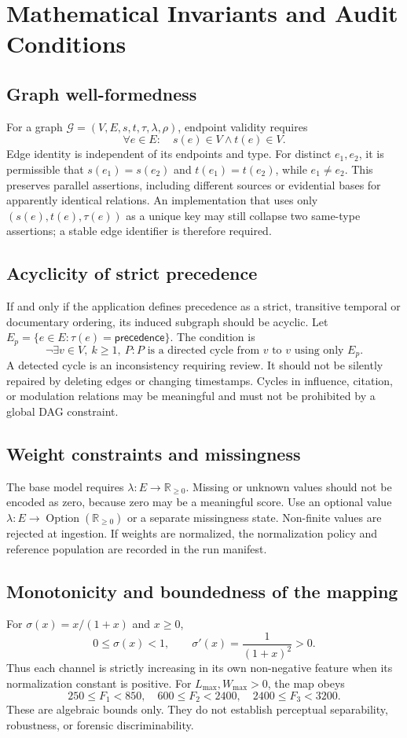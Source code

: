 \documentclass[11pt]{article}
\begin{document}
\section{Mathematical Invariants and Audit Conditions}
\subsection{Graph well-formedness}
For a graph $\mathcal{G}=(V,E,s,t,\tau,\lambda,\rho)$, endpoint validity requires
\[
\forall e\in E:\quad s(e)\in V\land t(e)\in V.
\]
Edge identity is independent of its endpoints and type. For distinct $e_1,e_2$, it is permissible that $s(e_1)=s(e_2)$ and $t(e_1)=t(e_2)$, while $e_1\neq e_2$. This preserves parallel assertions, including different sources or evidential bases for apparently identical relations. An implementation that uses only $(s(e),t(e),\tau(e))$ as a unique key may still collapse two same-type assertions; a stable edge identifier is therefore required.
\subsection{Acyclicity of strict precedence}
If and only if the application defines precedence as a strict, transitive temporal or documentary ordering, its induced subgraph should be acyclic. Let $E_p=\{e\in E:\tau(e)=\textsf{precedence}\}$. The condition is
\[
\neg\exists v\in V,\ k\geq1,\ P:
P\text{ is a directed cycle from }v\text{ to }v
\text{ using only }E_p.
\]
A detected cycle is an inconsistency requiring review. It should not be silently repaired by deleting edges or changing timestamps. Cycles in influence, citation, or modulation relations may be meaningful and must not be prohibited by a global DAG constraint.
\subsection{Weight constraints and missingness}
The base model requires $\lambda:E\to\mathbb{R}_{\geq0}$. Missing or unknown values should not be encoded as zero, because zero may be a meaningful score. Use an optional value $\lambda:E\to\operatorname{Option}(\mathbb{R}_{\geq0})$ or a separate missingness state. Non-finite values are rejected at ingestion. If weights are normalized, the normalization policy and reference population are recorded in the run manifest.
\subsection{Monotonicity and boundedness of the mapping}
For $\sigma(x)=x/(1+x)$ and $x\geq0$,
\[
0\leq\sigma(x)<1,\qquad
\sigma'(x)=\frac{1}{(1+x)^2}>0.
\]
Thus each channel is strictly increasing in its own non-negative feature when its normalization constant is positive. For $L_{\max},W_{\max}>0$, the map obeys
\[
250\leq F_1<850,\quad 600\leq F_2<2400,\quad
2400\leq F_3<3200.
\]
These are algebraic bounds only. They do not establish perceptual separability, robustness, or forensic discriminability.
\end{document}
